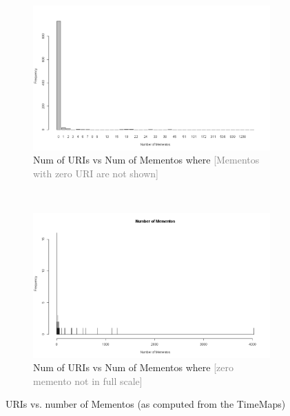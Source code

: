 \documentclass[a4paper,12pt]{article}
\begin{document}
\begin{figure}
        \centering
        \begin{subfigure}[b]{1\textwidth}
                \includegraphics[width=\textwidth]{Nmemento2.png}
                \caption{Num of URIs vs Num of Mementos where \textcolor{gray}{[Mementos with zero URI are not shown]}}
                \label{fig:fig4}
        \end{subfigure}
        ~ %
        
        \begin{subfigure}[b]{1\textwidth}
                \includegraphics[width=\textwidth]{Nmemento.png}
                \caption{Num of URIs vs Num of Mementos where \textcolor{gray}{[zero memento not in full scale]}}
                \label{fig:fig3}
        \end{subfigure}%
        
          
        
        
        \caption{URIs vs. number of Mementos (as computed from
the TimeMaps)}\label{fig:animals}
\end{figure}
\end{document}
